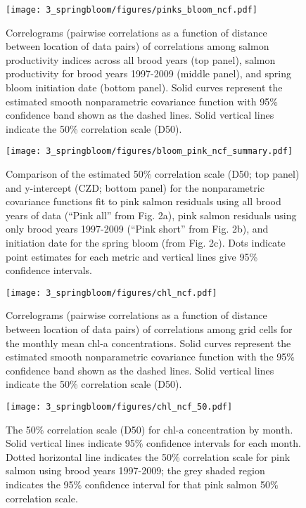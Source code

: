 \begin{figure}[htbp]
  \centering \texttt{[image: 3\_springbloom/figures/pinks\_bloom\_ncf.pdf]}
  \caption{Correlograms (pairwise correlations as a function of distance between
    location of data pairs) of correlations among salmon productivity indices
    across all brood years (top panel), salmon productivity for brood years
    1997-2009 (middle panel), and spring bloom initiation date (bottom panel).
    Solid curves represent the estimated smooth nonparametric covariance
    function with 95\% confidence band shown as the dashed lines. Solid vertical
    lines indicate the 50\% correlation scale (D50).}
  \label{fig:bloom:2}
\end{figure}

\begin{figure}[htbp]
  \centering \texttt{[image: 3\_springbloom/figures/bloom\_pink\_ncf\_summary.pdf]}
  \caption{Comparison of the estimated 50\% correlation scale (D50; top panel)
    and y-intercept (CZD; bottom panel) for the nonparametric covariance
    functions fit to pink salmon residuals using all brood years of data (``Pink
    all'' from Fig. 2a), pink salmon residuals using only brood years 1997-2009
    (``Pink short'' from Fig.  2b), and initiation date for the spring bloom
    (from Fig. 2c). Dots indicate point estimates for each metric and vertical
    lines give 95\% confidence intervals.}
  \label{fig:bloom:3}
\end{figure}

\begin{figure}[htbp]
  \centering \texttt{[image: 3\_springbloom/figures/chl\_ncf.pdf]}
  \caption{Correlograms (pairwise correlations as a function of distance between
    location of data pairs) of correlations among grid cells for the monthly
    mean chl-a concentrations. Solid curves represent the estimated smooth
    nonparametric covariance function with the 95\% confidence band shown as the
    dashed lines. Solid vertical lines indicate the 50\% correlation scale
    (D50).}
  \label{fig:bloom:4}
\end{figure}

\begin{figure}[htbp]
  \centering \texttt{[image: 3\_springbloom/figures/chl\_ncf\_50.pdf]}
  \caption{The 50\% correlation scale (D50) for chl-a concentration by month.
    Solid vertical lines indicate 95\% confidence intervals for each month.
    Dotted horizontal line indicates the 50\% correlation scale for pink salmon
    using brood years 1997-2009; the grey shaded region indicates the 95\%
    confidence interval for that pink salmon 50\% correlation scale.}
  \label{fig:bloom:5}
\end{figure}

